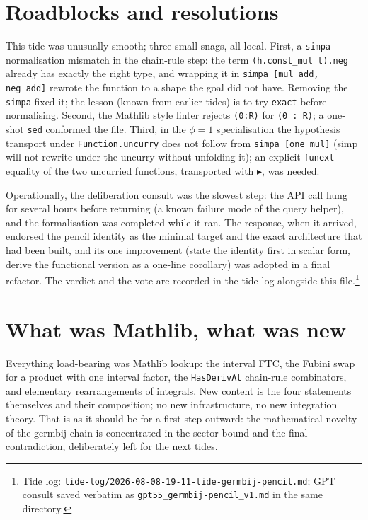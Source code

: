 \documentclass[11pt]{article}
\begin{document}
\section{Roadblocks and resolutions}

This tide was unusually smooth; three small snags, all local.
First, a \texttt{simpa}-normalisation mismatch in the chain-rule step: the
term \texttt{(h.const\_mul t).neg} already has exactly the right type, and
wrapping it in \texttt{simpa [mul\_add, neg\_add]} rewrote the function to a
shape the goal did not have. Removing the \texttt{simpa} fixed it; the lesson
(known from earlier tides) is to try \texttt{exact} before normalising.
Second, the Mathlib style linter rejects \texttt{(0:R)} for
\texttt{(0 : R)}; a one-shot \texttt{sed} conformed the file. Third, in the
$\phi = 1$ specialisation the hypothesis transport under
\texttt{Function.uncurry} does not follow from \texttt{simpa [one\_mul]}
(simp will not rewrite under the uncurry without unfolding it); an explicit
\texttt{funext} equality of the two uncurried functions, transported with
\texttt{\(\blacktriangleright\)}, was needed.

Operationally, the deliberation consult was the slowest step: the API call
hung for several hours before returning (a known failure mode of the query
helper), and the formalisation was completed while it ran. The response,
when it arrived, endorsed the pencil identity as the minimal target and the
exact architecture that had been built, and its one improvement (state the
identity first in scalar form, derive the functional version as a one-line
corollary) was adopted in a final refactor. The verdict and the vote are
recorded in the tide log alongside this file.\footnote{Tide log:
\texttt{tide-log/2026-08-08-19-11-tide-germbij-pencil.md}; GPT consult
saved verbatim as \texttt{gpt55\_germbij-pencil\_v1.md} in the same
directory.}

\section{What was Mathlib, what was new}

Everything load-bearing was Mathlib lookup: the interval FTC, the Fubini
swap for a product with one interval factor, the \texttt{HasDerivAt}
chain-rule combinators, and elementary rearrangements of integrals. New content is the
four statements themselves and their composition; no new infrastructure,
no new integration theory. That is as it should be for a first step
outward: the mathematical novelty of the germbij chain is concentrated in
the sector bound and the final contradiction, deliberately left for the
next tides.
\end{document}
